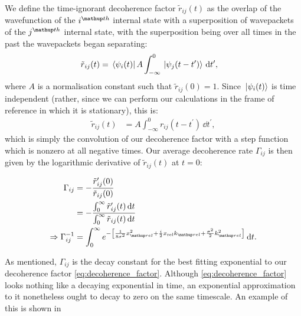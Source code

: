 We define the time-ignorant decoherence factor $\tilde r_{ij}(t)$ as the overlap of the wavefunction of the $i^\up{th}$ internal state with a superposition of wavepackets of the $j^\up{th}$ internal state, with the superposition being over all times in the past the wavepackets began separating:
\begin{align}
\tilde r_{ij}(t) &= \bra{\psi_i(t)} A\int_{-\infty}^0 \ket{\psi_j(t - t^\prime)} \,\dd t^\prime,
\end{align}
where $A$ is a normalisation constant such that $\tilde r_{ij}(0) = 1$.
Since $\ket{\psi_i(t)}$ is time independent (rather, since we can perform our calculations in the frame of reference in which it is stationary), this is:
\begin{align}
\tilde r_{ij}(t) &= A\int_{-\infty}^0 r_{ij}(t - t^\prime) \,\dd t^\prime,
\end{align}
which is simply the convolution of our decoherence factor with a step function which is nonzero at all negative times.
Our average decoherence rate $\Gamma_{ij}$ is then given by the logarithmic derivative of $\tilde r_{ij}(t)$ at $t=0$:

\begin{align}
\Gamma_{ij} &= -\frac {\tilde r_{ij}^\prime(0)} {\tilde r_{ij}(0)}\\
&= -\frac {\int_0^\infty \tilde r_{ij}^\prime(t)\,\dd t} {\int_0^\infty \tilde r_{ij}(t)\, \dd t}\\
\Rightarrow \Gamma_{ij}^{-1}&= \int_0^\infty e^{-\left[
        \frac{1} {8\sigma^2} x_\up{rel}^2
      + \frac i2 x_{\mathrm{rel}} k_\up{rel}
      + \frac{\sigma^2}{2} k_\up{rel}^2
      \right]}\, \dd t.\label{eq:gamma_integral}
\end{align}

As mentioned, $\Gamma_{ij}$ is the decay constant for the best fitting exponential to our decoherence factor \eqref{eq:decoherence_factor}. Although \eqref{eq:decoherence_factor} looks nothing like a decaying exponential in time, an exponential approximation to it nonetheless ought to decay to zero on the same timescale. An example of this is shown in 

